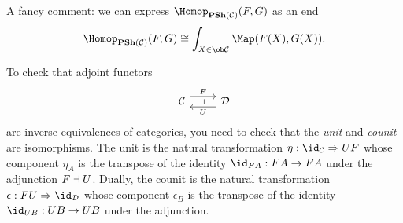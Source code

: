 \documentclass[../main.tex]{subfiles}
\begin{document}
A fancy comment: we can express $\Hom[\catPresheaf(\cat C)](F,G)$ as an end
\[ \Hom[\catPresheaf(\cat C)](F,G) \cong \int_{X\in\ob\cat C} \Map(F(X),G(X))\text{.} \]

\begin{rmk}
To check that adjoint functors
\begin{equation*}
  \begin{tikzcd}
    \cat C \ar[r, "{F}"{name=leftadj}, shift left=2] & \cat D \ar[l, "U"{name=rightadj}, shift left=2]
    \ar[from=leftadj, to=rightadj, phantom, "\leftadj" marking]
  \end{tikzcd}
\end{equation*}
are inverse equivalences of categories, you need to check that the \emph{unit} and \emph{counit} are isomorphisms.
The unit is the natural transformation $\eta\colon\id_{\cat C}\To UF$ whose component $\eta_A$ is the transpose of the identity $\id_{FA}\colon FA\to FA$ under the adjunction $F\dashv U$.
Dually, the counit is the natural transformation $\epsilon\colon FU\To\id_{\cat D}$ whose component $\epsilon_B$ is the transpose of the identity $\id_{UB}\colon UB\to UB$ under the adjunction.
\end{rmk}
\end{document}
